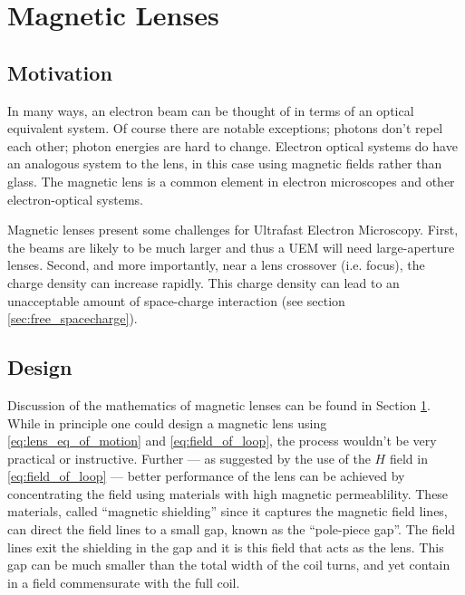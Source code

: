 
\section{Magnetic Lenses} \label{sec:mag_lens}

\subsection{Motivation}

In many ways, an electron beam can be thought of in terms of an optical equivalent system. 
Of course there are notable exceptions; photons don't repel each other; photon energies are hard to change.
Electron optical systems do have an analogous system to the lens, in this case using magnetic fields rather than glass. 
The magnetic lens is a common element in electron microscopes and other electron-optical systems.

Magnetic lenses present some challenges for Ultrafast Electron Microscopy.
First, the beams are likely to be much larger and thus a UEM will need large-aperture lenses.
Second, and more importantly, near a lens crossover (i.e. focus), the charge density can increase rapidly.
This charge density can lead to an unacceptable amount of space-charge interaction (see section \ref{sec:free_spacecharge}).

\subsection{Design}

Discussion of the mathematics of magnetic lenses can be found in Section \ref{sec:mag_lens}.
While in principle one could design a magnetic lens using \ref{eq:lens_eq_of_motion} and \ref{eq:field_of_loop}, the process wouldn't be very practical or instructive.
Further --- as suggested by the use of the $H$ field in \ref{eq:field_of_loop} --- better performance of the lens can be achieved by concentrating the field using materials with high magnetic permeablility.
These materials, called ``magnetic shielding'' since it captures the magnetic field lines, can direct the field lines to a small gap, known as the ``pole-piece gap''.
The field lines exit the shielding in the gap and it is this field that acts as the lens.
This gap can be much smaller than the total width of the coil turns, and yet contain in a field commensurate with the full coil.


